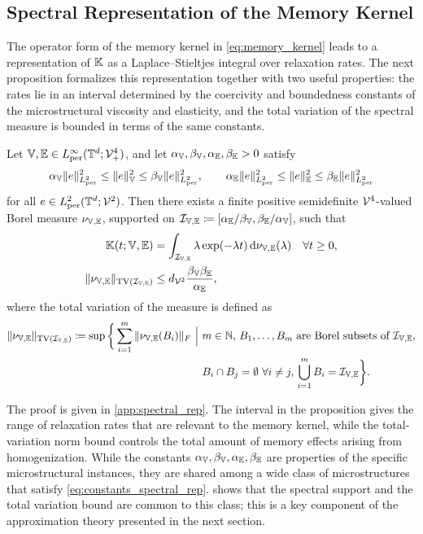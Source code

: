 \documentclass[3p, 12pt, preprint]{elsarticle}
\begin{document}
\subsection{Spectral Representation of the Memory Kernel}\label{subsec:spectral_rep}

The operator form of the memory kernel in \cref{eq:memory_kernel} leads to a representation of $\mathbb{K}$ as a Laplace--Stieltjes integral over relaxation rates. The next proposition formalizes this representation together with two useful properties: the rates lie in an interval determined by the coercivity and boundedness constants of the microstructural viscosity and elasticity, and the total variation of the spectral measure is bounded in terms of the same constants.

\begin{proposition}
\label{prop:spectral_rep}
Let $\mathbb{V},\mathbb{E}\in L^{\infty}_{\mathrm{per}}(\mathbb{T}^d;{\mathcal{V}}^4_{+})$, and let $\alpha_{\mathbb{V}},\beta_{\mathbb{V}},\alpha_{\mathbb{E}},\beta_{\mathbb{E}}>0$ satisfy
\begin{equation}\label{eq:constants_spectral_rep}
\alpha_{\mathbb{V}}\|e\|_{L^2_{\mathrm{per}}}^2 \le \|e\|_{\mathbb{V}}^2 \le \beta_{\mathbb{V}}\|e\|_{L^2_{\mathrm{per}}}^2,
\qquad
\alpha_{\mathbb{E}}\|e\|_{L^2_{\mathrm{per}}}^2 \le \|e\|_{\mathbb{E}}^2 \le \beta_{\mathbb{E}}\|e\|_{L^2_{\mathrm{per}}}^2
\end{equation}
for all $e\in L^2_{\mathrm{per}}(\mathbb{T}^d;{\mathcal{V}}^2)$. Then there exists a finite positive semidefinite ${\mathcal{V}}^4$-valued Borel measure $\nu_{\mathbb{V},\mathbb{E}}$, supported on ${\mathcal{I}}_{\mathbb{V},\mathbb{E}}\coloneqq[\alpha_{\mathbb{E}}/\beta_{\mathbb{V}},\beta_{\mathbb{E}}/\alpha_{\mathbb{V}}]$, such that
\begin{align}
\mathbb{K}(t;\mathbb{V},\mathbb{E})&=\int_{{\mathcal{I}}_{\mathbb{V},\mathbb{E}}} \lambda \exp(-\lambda t)\,\mathrm{d}\nu_{\mathbb{V},\mathbb{E}}(\lambda)
\quad \forall t\ge 0,\label{eq:K_laplace}\\
\|\nu_{\mathbb{V},\mathbb{E}}\|_{\mathrm{TV}({\mathcal{I}}_{\mathbb{V},\mathbb{E}})}
&\le
d_{{\mathcal{V}}^2}\frac{\beta_{\mathbb{V}}\beta_{\mathbb{E}}}{\alpha_{\mathbb{E}}}, \label{eq:uniform_TV_bound_nu_explicit}
\end{align}
where the total variation of the measure is defined as
\begin{align}\label{eq:tv_norm_def}
\|\nu_{\bV,\bE}\|_{\mathrm{TV}(\cI_{\bV,\bE})}
\coloneqq
\sup\bigg\{\sum_{i=1}^{m}\|\nu_{\bV,\bE}(B_i)\|_{F}\ \Big\vert\ &m\in\bN,\,
B_1,\dots,B_m\ \text{are Borel subsets of }\cI_{\bV,\bE},\nonumber\\
&B_i\cap B_j=\emptyset\ \forall i\ne j,\,\bigcup_{i=1}^{m}B_i=\cI_{\bV,\bE}\bigg\}.
\end{align}
\end{proposition}
The proof is given in \cref{app:spectral_rep}. The interval in the proposition gives the range of relaxation rates that are relevant to the memory kernel, while the total-variation norm bound controls the total amount of memory effects arising from homogenization. While the constants $\alpha_{\mathbb{V}},\beta_{\mathbb{V}},\alpha_{\mathbb{E}},\beta_{\mathbb{E}}$ are properties of the specific microstructural instances, they are shared among a wide class of microstructures that satisfy \cref{eq:constants_spectral_rep}.  shows that the spectral support and the total variation bound are common to this class; this is a key component of the approximation theory presented in the next section.
\end{document}
